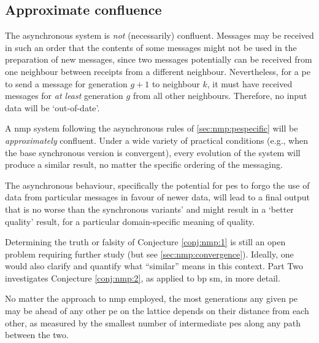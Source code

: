 \subsection{Approximate confluence}
The asynchronous system is \emph{not} (necessarily) confluent.  Messages may be received in such an order that the contents of some messages might not be used in the preparation of new messages, since two messages potentially can be received from one neighbour between receipts from a different neighbour.  Nevertheless, for a \gls{pe} to send a message for generation \(g + 1\) to neighbour \(k\), it must have received messages for \emph{at least} generation \(g\) from all other neighbours.  Therefore, no input data will be `out-of-date'.

\begin{conjecture}\label{conj:nmp:1}
A \gls{nmp} system following the asynchronous rules of \autoref{sec:nmp:pespecific} will be \emph{approximately} confluent.  Under a wide variety of practical conditions (e.g., when the base synchronous version is convergent), every evolution of the system will produce a similar result, no matter the specific ordering of the messaging.
\end{conjecture}

\begin{conjecture}\label{conj:nmp:2}
    The asynchronous behaviour, specifically the potential for \glspl{pe} to forgo the use of data from particular messages in favour of newer data, will lead to a final output that is no worse than the synchronous variants' and might result in a `better quality' result, for a particular domain-specific meaning of quality.
\end{conjecture}

Determining the truth or falsity of Conjecture \ref{conj:nmp:1} is still an open problem requiring further study (but see \autoref{sec:nmp:convergence}).  Ideally, one would also clarify and quantify what ``similar'' means in this context.  Part Two investigates Conjecture \ref{conj:nmp:2}, as applied to \gls{bp} \gls{sm}, in more detail.

\begin{proposition}\label{prop:nmp:3}
    No matter the approach to \gls{nmp} employed, the most generations any given \gls{pe} may be ahead of any other \gls{pe} on the lattice depends on their distance from each other, as measured by the smallest number of intermediate \glspl{pe} along any path between the two.
\end{proposition}

